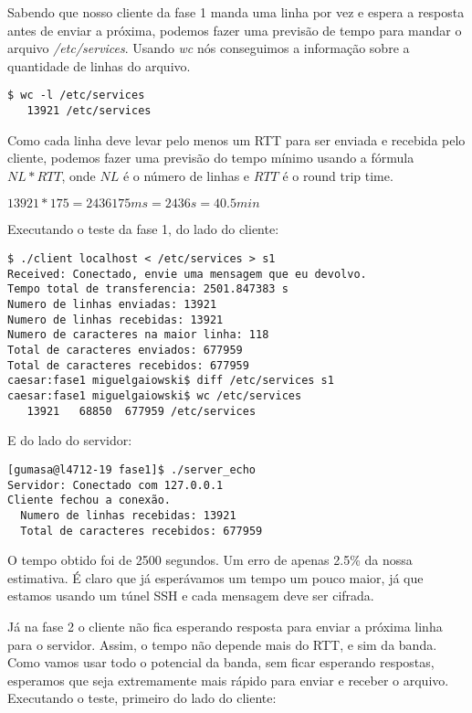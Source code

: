 \documentclass[12pt,a4paper]{article}
\begin{document}
Sabendo que nosso cliente da fase 1 manda uma linha por vez e espera a
resposta antes de enviar a próxima, podemos fazer uma previsão de
tempo para mandar o arquivo \textit{/etc/services}. Usando \textit{wc}
nós conseguimos a informação sobre a quantidade de linhas do arquivo.

\begin{verbatim}
$ wc -l /etc/services 
   13921 /etc/services
\end{verbatim}

Como cada linha deve levar pelo menos um RTT para ser enviada e
recebida pelo cliente, podemos fazer uma previsão do tempo mínimo usando a fórmula $NL
* RTT $, onde $NL$ é o número de linhas e $RTT$ é o round trip time.

$13921 * 175 = 2436175 ms = 2436 s = 40.5 min$

Executando o teste da fase 1, do lado do cliente:

\begin{verbatim}
$ ./client localhost < /etc/services > s1
Received: Conectado, envie uma mensagem que eu devolvo.
Tempo total de transferencia: 2501.847383 s
Numero de linhas enviadas: 13921
Numero de linhas recebidas: 13921
Numero de caracteres na maior linha: 118
Total de caracteres enviados: 677959
Total de caracteres recebidos: 677959
caesar:fase1 miguelgaiowski$ diff /etc/services s1
caesar:fase1 miguelgaiowski$ wc /etc/services 
   13921   68850  677959 /etc/services
\end{verbatim}

E do lado do servidor: 

\begin{verbatim}
[gumasa@l4712-19 fase1]$ ./server_echo 
Servidor: Conectado com 127.0.0.1
Cliente fechou a conexão.
  Numero de linhas recebidas: 13921
  Total de caracteres recebidos: 677959
\end{verbatim}

O tempo obtido foi de 2500 segundos. Um erro de apenas 2.5\% da nossa
estimativa. É claro que já esperávamos um tempo um pouco maior, já que
estamos usando um túnel SSH e cada mensagem deve ser cifrada. 

Já na fase 2 o cliente não fica esperando resposta para enviar a
próxima linha para o servidor. Assim, o tempo não depende mais do RTT,
e sim da banda. Como vamos usar todo o potencial da banda, sem ficar
esperando respostas, esperamos que seja extremamente mais rápido para
enviar e receber o arquivo. Executando o teste, primeiro do lado do cliente:
\end{document}
